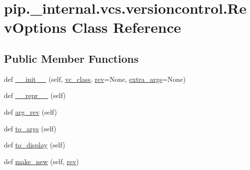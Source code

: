 \hypertarget{classpip_1_1__internal_1_1vcs_1_1versioncontrol_1_1RevOptions}{}\section{pip.\+\_\+internal.\+vcs.\+versioncontrol.\+Rev\+Options Class Reference}
\label{classpip_1_1__internal_1_1vcs_1_1versioncontrol_1_1RevOptions}
\subsection*{Public Member Functions}
\begin{DoxyCompactItemize}
\item 
def \hyperlink{classpip_1_1__internal_1_1vcs_1_1versioncontrol_1_1RevOptions_aae223b94ed048272015bd2434e3bf142}{\+\_\+\+\_\+init\+\_\+\+\_\+} (self, \hyperlink{classpip_1_1__internal_1_1vcs_1_1versioncontrol_1_1RevOptions_a770a27278283203ab75993df2c00cf5e}{vc\+\_\+class}, \hyperlink{classpip_1_1__internal_1_1vcs_1_1versioncontrol_1_1RevOptions_ab8e46bf2192c9cdb1fe57830b55d7fb8}{rev}=None, \hyperlink{classpip_1_1__internal_1_1vcs_1_1versioncontrol_1_1RevOptions_a4391d5121e611505a052e4025d264a36}{extra\+\_\+args}=None)
\item 
def \hyperlink{classpip_1_1__internal_1_1vcs_1_1versioncontrol_1_1RevOptions_ad383f60d474b53e03d3151509c8c070e}{\+\_\+\+\_\+repr\+\_\+\+\_\+} (self)
\item 
def \hyperlink{classpip_1_1__internal_1_1vcs_1_1versioncontrol_1_1RevOptions_a408b7810d56a99e56f5f44282d07d356}{arg\+\_\+rev} (self)
\item 
def \hyperlink{classpip_1_1__internal_1_1vcs_1_1versioncontrol_1_1RevOptions_a44cc7667eb9f9d622ae6d6caef1eb9f8}{to\+\_\+args} (self)
\item 
def \hyperlink{classpip_1_1__internal_1_1vcs_1_1versioncontrol_1_1RevOptions_a0916412cf29576b2cda21e9df739de34}{to\+\_\+display} (self)
\item 
def \hyperlink{classpip_1_1__internal_1_1vcs_1_1versioncontrol_1_1RevOptions_acb5d6c64ee602085194893a0f280f591}{make\+\_\+new} (self, \hyperlink{classpip_1_1__internal_1_1vcs_1_1versioncontrol_1_1RevOptions_ab8e46bf2192c9cdb1fe57830b55d7fb8}{rev})
\end{DoxyCompactItemize}
